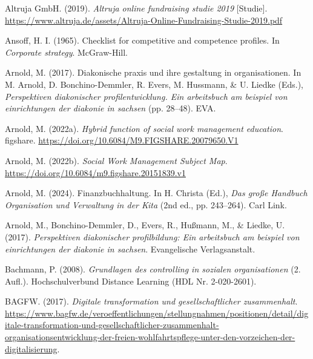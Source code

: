 \documentclass[
  letterpaper,
]{book}
\newlength{\cslhangindent}
\newenvironment{CSLReferences}[2] %
 {\begin{list}{}{%
  \setlength{\itemindent}{0pt}
  \setlength{\leftmargin}{0pt}
  \setlength{\parsep}{0pt}
  \ifodd #1
   \setlength{\leftmargin}{\cslhangindent}
   \setlength{\itemindent}{-1\cslhangindent}
  \fi
  \setlength{\itemsep}{#2\baselineskip}}}
 {\end{list}}
\begin{document}
\label{refs}
\begin{CSLReferences}{1}{0}
Altruja GmbH. (2019). \emph{Altruja online fundraising studie 2019}
{[}Studie{]}.
\url{https://www.altruja.de/assets/Altruja-Online-Fundraising-Studie-2019.pdf}

Ansoff, H. I. (1965). Checklist for competitive and competence profiles.
In \emph{Corporate strategy}. McGraw-Hill.

Arnold, M. (2017). Diakonische praxis und ihre gestaltung in
organisationen. In M. Arnold, D. Bonchino-Demmler, R. Evers, M.
Hussmann, \& U. Liedke (Eds.), \emph{Perspektiven diakonischer
profilentwicklung. Ein arbeitsbuch am beispiel von einrichtungen der
diakonie in sachsen} (pp. 28--48). EVA.

Arnold, M. (2022a). \emph{Hybrid function of social work management
education}. figshare.
\url{https://doi.org/10.6084/M9.FIGSHARE.20079650.V1}

Arnold, M. (2022b). \emph{{Social Work Management Subject Map}}.
\url{https://doi.org/10.6084/m9.figshare.20151839.v1}

Arnold, M. (2024). Finanzbuchhaltung. In H. Christa (Ed.), \emph{Das
große Handbuch Organisation und Verwaltung in der Kita} (2nd ed., pp.
243--264). Carl Link.

Arnold, M., Bonchino-Demmler, D., Evers, R., Hußmann, M., \& Liedke, U.
(2017). \emph{Perspektiven diakonischer profilbildung: Ein arbeitsbuch
am beispiel von einrichtungen der diakonie in sachsen}. Evangelische
Verlagsanstalt.

Bachmann, P. (2008). \emph{Grundlagen des controlling in sozialen
organisationen} (2. Aufl.). Hochschulverbund Distance Learning (HDL Nr.
2-020-2601).

BAGFW. (2017). \emph{Digitale transformation und gesellschaftlicher
zusammenhalt}.
\url{https://www.bagfw.de/veroeffentlichungen/stellungnahmen/positionen/detail/digitale-transformation-und-gesellschaftlicher-zusammenhalt-organisationsentwicklung-der-freien-wohlfahrtspflege-unter-den-vorzeichen-der-digitalisierung}.


\end{CSLReferences}
\end{document}
